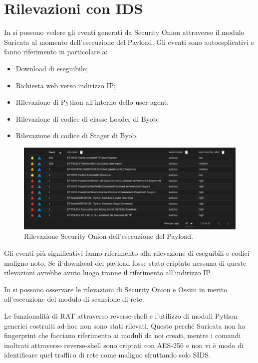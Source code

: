 \section{Rilevazioni con IDS}


In  si possono vedere gli eventi generati da Security Onion attraverso il modulo Suricata al momento dell'esecuzione del Payload. Gli eventi sono autoesplicativi e fanno riferimento in particolare a:
\begin{itemize}
    \item Download di eseguibile;
    \item Richiesta web verso indirizzo IP;
    \item Rilevazione di Python all'interno dello user-agent;
    \item Rilevazione di codice di classe Loader di Byob;
    \item Rilevazione di codice di Stager di Byob.
\end{itemize}

\begin{figure}[hbtp]
    \centering
    \includegraphics[width=\textwidth]{res/fig/byob-result-1.png}
    \caption{Rilevazione Security Onion dell'esecuzione del Payload.}
    \label{fig:byob-result-1}
\end{figure}

Gli eventi più significativi fanno riferimento alla rilevazione di eseguibili e codici maligno noto. Se il download del payload fosse stato criptato nessuna di queste rilevazioni   avrebbe avuto luogo tranne il riferimento all'indirizzo IP.

In  si possono osservare le rilevazioni di Security Onion e Ossim in merito all'esecuzione del modulo di scansione di rete.

Le funzionalità di RAT attraverso reverse-shell e l'utilizzo di moduli Python generici costruiti ad-hoc non sono stati rilevati.
Questo perché  Suricata non ha fingerprint che facciano riferimento ai moduli da noi creati, mentre i comandi inoltrati attraverso reverse-shell sono criptati con AES-256 e non vi è modo di identificare quel traffico di rete come maligno sfruttando solo SIDS.

